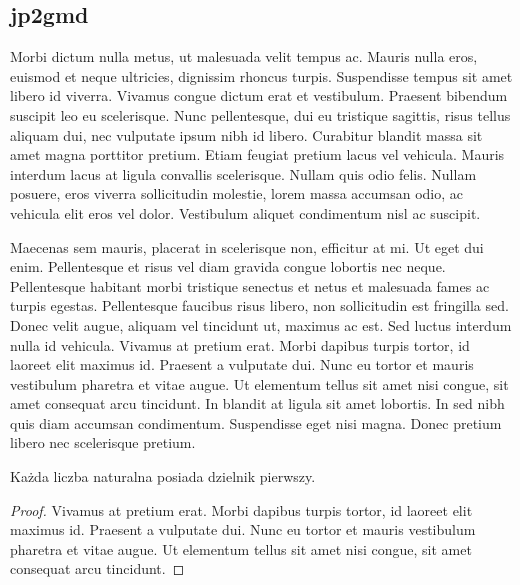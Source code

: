 \subsection{jp2gmd}
Morbi dictum nulla metus, ut malesuada velit tempus ac. Mauris nulla eros, euismod et neque ultricies, dignissim rhoncus turpis. Suspendisse tempus sit amet libero id viverra. Vivamus congue dictum erat et vestibulum. Praesent bibendum suscipit leo eu scelerisque. Nunc pellentesque, dui eu tristique sagittis, risus tellus aliquam dui, nec vulputate ipsum nibh id libero. Curabitur blandit massa sit amet magna porttitor pretium. Etiam feugiat pretium lacus vel vehicula. Mauris interdum lacus at ligula convallis scelerisque. Nullam quis odio felis. Nullam posuere, eros viverra sollicitudin molestie, lorem massa accumsan odio, ac vehicula elit eros vel dolor. Vestibulum aliquet condimentum nisl ac suscipit.
\\
\par
Maecenas sem mauris, placerat in scelerisque non, efficitur at mi. Ut eget dui enim. Pellentesque et risus vel diam gravida congue lobortis nec neque. Pellentesque habitant morbi tristique senectus et netus et malesuada fames ac turpis egestas. Pellentesque faucibus risus libero, non sollicitudin est fringilla sed. Donec velit augue, aliquam vel tincidunt ut, maximus ac est. Sed luctus interdum nulla id vehicula. Vivamus at pretium erat. Morbi dapibus turpis tortor, id laoreet elit maximus id. Praesent a vulputate dui. Nunc eu tortor et mauris vestibulum pharetra et vitae augue. Ut elementum tellus sit amet nisi congue, sit amet consequat arcu tincidunt. In blandit at ligula sit amet lobortis. In sed nibh quis diam accumsan condimentum. Suspendisse eget nisi magna. Donec pretium libero nec scelerisque pretium.
\begin{theorem}
    Każda liczba naturalna posiada dzielnik pierwszy.
\end{theorem}
\begin{proof}
    Vivamus at pretium erat. Morbi dapibus turpis tortor, id laoreet elit maximus id. Praesent a vulputate dui. Nunc eu tortor et mauris vestibulum pharetra et vitae augue. Ut elementum tellus sit amet nisi congue, sit amet consequat arcu tincidunt.
\end{proof}